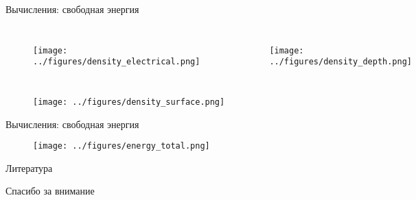 \documentclass{beamer}
\begin{document}
\begin{frame}{Вычисления: свободная энергия}
\vspace{-0.3cm}
\begin{columns}
\begin{figure}
	\texttt{[image: ../figures/density\_electrical.png]}
\end{figure}
\begin{figure}
	\texttt{[image: ../figures/density\_depth.png]}
\end{figure}
\end{columns}
\vspace{-0.3cm}
\begin{figure}
	\texttt{[image: ../figures/density\_surface.png]}
\end{figure}
\end{frame}


\begin{frame}{Вычисления: свободная энергия}
\begin{figure}
	\texttt{[image: ../figures/energy\_total.png]}
\end{figure}
\end{frame}


\begin{frame}{Литература}
\printbibliography
\end{frame}


\begin{frame}{}
\begin{center}
	\Large
	Спасибо за внимание
\end{center}
\end{frame}
\end{document}
